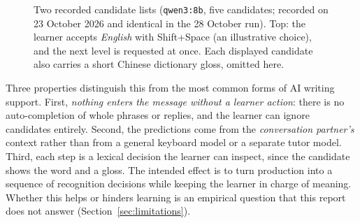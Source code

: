\documentclass[11pt,a4paper]{article}
\newcommand{\code}[1]{\texttt{#1}}
\begin{document}
\begin{figure}[ht]
\centering
{}
\caption{Two recorded candidate lists (\code{qwen3:8b}, five candidates; recorded on 23 October 2026 and identical in the 28 October run). Top: the learner accepts \emph{English} with Shift+Space (an illustrative choice), and the next level is requested at once. Each displayed candidate also carries a short Chinese dictionary gloss, omitted here.}
\label{fig:walk}
\end{figure}

Three properties distinguish this from the most common forms of AI writing support. First, \emph{nothing enters the message without a learner action}: there is no auto-completion of whole phrases or replies, and the learner can ignore candidates entirely. Second, the predictions come from the \emph{conversation partner's} context rather than from a general keyboard model or a separate tutor model. Third, each step is a lexical decision the learner can inspect, since the candidate shows the word and a gloss. The intended effect is to turn production into a sequence of recognition decisions while keeping the learner in charge of meaning. Whether this helps or hinders learning is an empirical question that this report does not answer (Section~\ref{sec:limitations}).
\end{document}
